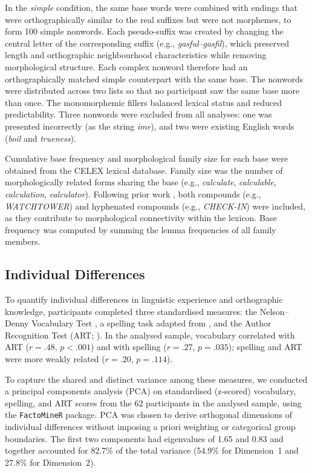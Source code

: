 In the \textit{simple} condition, the same base words were combined with endings that were orthographically similar to the real suffixes but were not morphemes, to form 100 simple nonwords. Each pseudo-suffix was created by changing the central letter of the corresponding suffix (e.g., \textit{gasful}--\textit{gasfil}), which preserved length and orthographic neighbourhood characteristics while removing morphological structure. Each complex nonword therefore had an orthographically matched simple counterpart with the same base. The nonwords were distributed across two lists so that no participant saw the same base more than once. The monomorphemic fillers balanced lexical status and reduced predictability. Three nonwords were excluded from all analyses: one was presented incorrectly (as the string \textit{ime}), and two were existing English words (\textit{boil} and \textit{trueness}).

Cumulative base frequency and morphological family size for each base were obtained from the CELEX lexical database. Family size was the number of morphologically related forms sharing the base (e.g., \textit{calculate}, \textit{calculable}, \textit{calculation}, \textit{calculator}). Following prior work \citep[e.g.,][]{dejongMorphologicalFamilySize2000, dejongProcessingRepresentationDutch2002}, both compounds (e.g., \textit{WATCHTOWER}) and hyphenated compounds (e.g., \textit{CHECK-IN}) were included, as they contribute to morphological connectivity within the lexicon. Base frequency was computed by summing the lemma frequencies of all family members.

\subsection{Individual Differences}

To quantify individual differences in linguistic experience and orthographic knowledge, participants completed three standardised measures: the Nelson--Denny Vocabulary Test \citep{brownNelsonDennyReadingTest1993}, a spelling task adapted from \citet{sawiIndividualDifferencesSensitivity2016}, and the Author Recognition Test (ART; \citealt{stanovichExposurePrintOrthographic1989}). In the analysed sample, vocabulary correlated with ART ($r = .48$, $p < .001$) and with spelling ($r = .27$, $p = .035$); spelling and ART were more weakly related ($r = .20$, $p = .114$).

To capture the shared and distinct variance among these measures, we conducted a principal components analysis (PCA) on standardised (z-scored) vocabulary, spelling, and ART scores from the 62 participants in the analysed sample, using the \texttt{FactoMineR} package. PCA was chosen to derive orthogonal dimensions of individual differences without imposing a priori weighting or categorical group boundaries. The first two components had eigenvalues of 1.65 and 0.83 and together accounted for 82.7\% of the total variance (54.9\% for Dimension~1 and 27.8\% for Dimension~2). %

